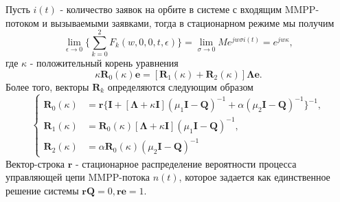 \begin{theorem} \label{R_theorem}
	Пусть $i(t)$ - количество заявок на орбите в системе с входящим MMPP-потоком и вызываемыми заявками, тогда в стационарном режиме мы получим
	\begin{equation*}
		\lim_{\epsilon \xrightarrow{} 0}\{\sum_{k=0}^{2}F_{k}(w,0,0,t,\epsilon)\} = \lim_{\sigma \xrightarrow{} 0} M e^{jw\sigma i(t)} = e^{jw\kappa},
	\end{equation*}
где $\kappa$ - положительный корень уравнения
\begin{equation*}
	\kappa \boldsymbol{R}_{0}(\kappa)\boldsymbol{e} = [\boldsymbol{R}_{1}(\kappa) + \boldsymbol{R}_{2}(\kappa)]\boldsymbol{\Lambda}\boldsymbol{e}.
\end{equation*}
Более того, векторы $\boldsymbol{R}_{k}$ определяются следующим образом
\begin{equation*}
	\left\{
	\begin{aligned}
		\boldsymbol{R}_{0}(\kappa) & = \boldsymbol{r}\{\boldsymbol{I} + [\boldsymbol{\Lambda} + \kappa\boldsymbol{I}](\mu_{1}\boldsymbol{I}-\boldsymbol{Q})^{-1}+\alpha(\mu_{2}\boldsymbol{I}-\boldsymbol{Q})^{-1}\}^{-1},\\
		\boldsymbol{R}_{1}(\kappa) & = \boldsymbol{R}_{0}(\kappa)[\boldsymbol{\Lambda} + \kappa\boldsymbol{I}](\mu_{1}\boldsymbol{I} - \boldsymbol{Q})^{-1},\\
		\boldsymbol{R}_{2}(\kappa) & = \alpha\boldsymbol{R}_{0}(\kappa)(\mu_{2}\boldsymbol{I} - \boldsymbol{Q})^{-1}
	\end{aligned}
\right.
\end{equation*}
Вектор-строка $\boldsymbol{r}$ - стационарное распределение вероятности процесса управляющей цепи MMPP-потока $n(t)$, которое задается как единственное решение системы $\boldsymbol{r}\boldsymbol{Q} =0, \boldsymbol{r}\boldsymbol{e} = 1$.
\end{theorem}
